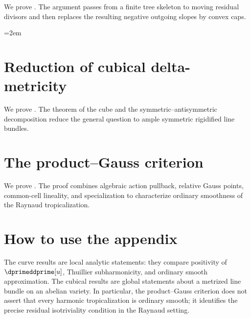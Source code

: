 We prove .  The argument
passes from a finite tree skeleton to moving residual divisors and then
replaces the resulting negative outgoing slopes by convex caps.

\begingroup
\emergencystretch=2em

\endgroup

\section{Reduction of cubical delta-metricity}
\label{sec:appN-cubical-reduction}

We prove .  The theorem of the cube and the
symmetric--antisymmetric decomposition reduce the general question to
ample symmetric rigidified line bundles.

\begingroup
\small

\endgroup

\section{The product--Gauss criterion}
\label{sec:appN-product-gauss}

We prove .  The proof combines
algebraic action pullback, relative Gauss points, common-cell lineality, and
specialization to characterize ordinary smoothness of the Raynaud
tropicalization.

\begingroup
\small

\endgroup

\section{How to use the appendix}
\label{sec:appN-use}

The curve results are local analytic statements: they compare positivity of
\(\dprimeddprime[u]\), Thuillier subharmonicity, and ordinary smooth
approximation.  The cubical results are global statements about a metrized
line bundle on an abelian variety.  In particular, the product--Gauss
criterion does not assert that every harmonic tropicalization is ordinary
smooth; it identifies the precise residual isotriviality condition in the
Raynaud setting.
